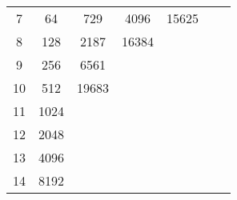\documentclass[review,12pt]{elsarticle}
\begin{document}
\begin{table}[htbp!]
\begin{tabular}{ccccccc}
\multicolumn{1}{|c|}{7}  & \multicolumn{1}{c|}{64}    & \multicolumn{1}{c|}{729}                      & \multicolumn{1}{c|}{4096}                     & \multicolumn{1}{c|}{15625}                    & \multicolumn{1}{c|}{\cellcolor[HTML]{9B9B9B}} &                            \\ \cline{1-6}
\multicolumn{1}{|c|}{8}  & \multicolumn{1}{c|}{128}   & \multicolumn{1}{c|}{2187}                     & \multicolumn{1}{c|}{16384}                    & \multicolumn{1}{c|}{\cellcolor[HTML]{9B9B9B}} & \multicolumn{1}{c|}{\cellcolor[HTML]{9B9B9B}} &                            \\ \cline{1-6}
\multicolumn{1}{|c|}{9}  & \multicolumn{1}{c|}{256}   & \multicolumn{1}{c|}{6561}                     & \multicolumn{1}{c|}{\cellcolor[HTML]{9B9B9B}} & \multicolumn{1}{c|}{\cellcolor[HTML]{9B9B9B}} & \multicolumn{1}{c|}{\cellcolor[HTML]{9B9B9B}} &                            \\ \cline{1-6}
\multicolumn{1}{|c|}{10} & \multicolumn{1}{c|}{512}   & \multicolumn{1}{c|}{19683}                    & \multicolumn{1}{c|}{\cellcolor[HTML]{9B9B9B}} & \multicolumn{1}{c|}{\cellcolor[HTML]{9B9B9B}} & \multicolumn{1}{c|}{\cellcolor[HTML]{9B9B9B}} &                            \\ \cline{1-6}
\multicolumn{1}{|c|}{11} & \multicolumn{1}{c|}{1024}  & \multicolumn{1}{c|}{\cellcolor[HTML]{9B9B9B}} & \multicolumn{1}{c|}{\cellcolor[HTML]{9B9B9B}} & \multicolumn{1}{c|}{\cellcolor[HTML]{9B9B9B}} & \multicolumn{1}{c|}{\cellcolor[HTML]{9B9B9B}} &                            \\ \cline{1-6}
\multicolumn{1}{|c|}{12} & \multicolumn{1}{c|}{2048}  & \multicolumn{1}{c|}{\cellcolor[HTML]{9B9B9B}} & \multicolumn{1}{c|}{\cellcolor[HTML]{9B9B9B}} & \multicolumn{1}{c|}{\cellcolor[HTML]{9B9B9B}} & \multicolumn{1}{c|}{\cellcolor[HTML]{9B9B9B}} &                            \\ \cline{1-6}
\multicolumn{1}{|c|}{13} & \multicolumn{1}{c|}{4096}  & \multicolumn{1}{c|}{\cellcolor[HTML]{9B9B9B}} & \multicolumn{1}{c|}{\cellcolor[HTML]{9B9B9B}} & \multicolumn{1}{c|}{\cellcolor[HTML]{9B9B9B}} & \multicolumn{1}{c|}{\cellcolor[HTML]{9B9B9B}} &                            \\ \cline{1-6}
\multicolumn{1}{|c|}{14} & \multicolumn{1}{c|}{8192}  & \multicolumn{1}{c|}{\cellcolor[HTML]{9B9B9B}} & \multicolumn{1}{c|}{\cellcolor[HTML]{9B9B9B}} & \multicolumn{1}{c|}{\cellcolor[HTML]{9B9B9B}} & \multicolumn{1}{c|}{\cellcolor[HTML]{9B9B9B}} &                            \\ \cline{1-6}

\end{tabular}
\end{table}
\end{document}
